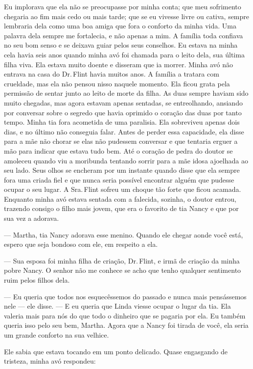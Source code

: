 Eu implorava que ela não se preocupasse por minha conta; que meu
sofrimento chegaria ao fim mais cedo ou mais tarde; que se eu vivesse
livre ou cativa, sempre lembraria dela como uma boa amiga que fora o
conforto da minha vida. Uma palavra dela sempre me fortalecia, e não
apenas a mim. A família toda confiava no seu bom senso e se deixava
guiar pelos seus conselhos. Eu estava na minha cela havia seis anos
quando minha avó foi chamada para o leito dela, sua última filha viva.
Ela estava muito doente e disseram que ia morrer. Minha avó não entrava
na casa do Dr.\,Flint havia muitos anos. A família a tratara com
crueldade, mas ela não pensou nisso naquele momento. Ela ficou grata
pela permissão de sentar junto ao leito de morte da filha. As duas
sempre haviam sido muito chegadas, mas agora estavam apenas sentadas, se
entreolhando, ansiando por conversar sobre o segredo que havia oprimido
o coração das duas por tanto tempo. Minha tia fora acometida de uma
paralisia. Ela sobreviveu apenas dois dias, e no último não conseguia
falar. Antes de perder essa capacidade, ela disse para a mãe não chorar
se elas não pudessem conversar e que tentaria erguer a mão para indicar
que estava tudo bem. Até o coração de pedra do doutor se amoleceu quando
viu a moribunda tentando sorrir para a mãe idosa ajoelhada ao seu lado.
Seus olhos se encheram por um instante quando disse que ela sempre fora
uma criada fiel e que nunca seria possível encontrar alguém que pudesse
ocupar o seu lugar. A Sra.\,Flint sofreu um choque tão forte que ficou
acamada. Enquanto minha avó estava sentada com a falecida, sozinha, o
doutor entrou, trazendo consigo o filho mais jovem, que era o favorito
de tia Nancy e que por sua vez a adorava.

--- Martha, tia Nancy adorava esse menino. Quando ele chegar aonde você
está, espero que seja bondoso com ele, em respeito a ela.

--- Sua esposa foi minha filha de criação, Dr.\,Flint, e irmã de criação
da minha pobre Nancy. O senhor não me conhece se acho que tenho qualquer
sentimento ruim pelos filhos dela.

--- Eu queria que todos nos
esquecêssemos do passado e nunca mais pensássemos nele --- ele disse.
--- E eu queria que Linda viesse ocupar o lugar da tia. Ela valeria mais
para nós do que todo o dinheiro que se pagaria por ela. Eu também queria
isso pelo seu bem, Martha. Agora que a Nancy foi tirada de você, ela
seria um grande conforto na sua velhice.

Ele sabia que estava tocando em um ponto delicado. Quase engasgando de
tristeza, minha avó respondeu:

